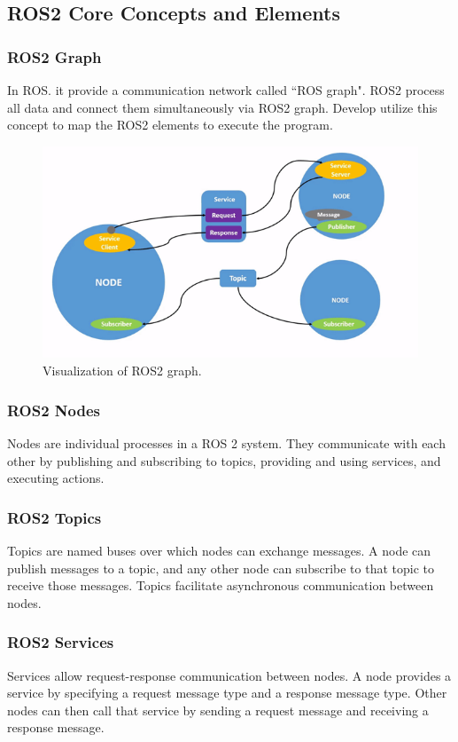 \subsection{ROS2 Core Concepts and Elements}
\subsubsection{ROS2 Graph}
In ROS. it provide a communication network called  ``ROS graph". ROS2 process all data and connect them simultaneously via ROS2 graph. Develop utilize this concept to map the ROS2 elements to execute the program.\\

\begin{figure}[h]
  \centering
  \includegraphics[width=120mm]{./fig/chap3/node.png}
  \vspace{2mm}
  \caption{Visualization of ROS2 graph. \cite{ros2}}\label{ros2_graph}
\end{figure}

\subsubsection{ROS2 Nodes}
Nodes are individual processes in a ROS 2 system. They communicate with each other by publishing and subscribing to topics, providing and using services, and executing actions.

\subsubsection{ROS2 Topics}
Topics are named buses over which nodes can exchange messages. A node can publish messages to a topic, and any other node can subscribe to that topic to receive those messages. Topics facilitate asynchronous communication between nodes.
 
\subsubsection{ROS2 Services}
Services allow request-response communication between nodes. A node provides a service by specifying a request message type and a response message type. Other nodes can then call that service by sending a request message and receiving a response message.
 
